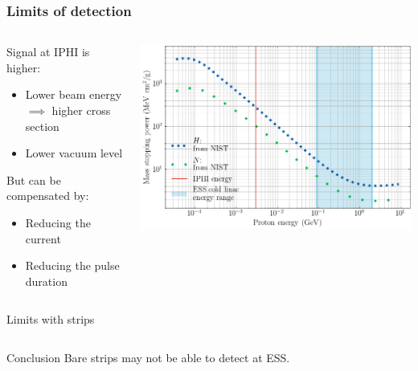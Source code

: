 \begin{frame}
  \frametitle{Limits of detection}
  \begin{columns}[T]
    \begin{column}{0.35\textwidth}
      \begin{block}{Signal at IPHI is higher:}
        \begin{itemize}
          \item Lower beam energy $\implies$ higher cross section
          \item Lower vacuum level
        \end{itemize}
        But can be compensated by:
        \begin{itemize}
          \item Reducing the current
          \item Reducing the pulse duration
        \end{itemize}
      \end{block}
    \end{column}
    \begin{column}{0.55\textwidth}
      \centering
      \includegraphics[width=1\textwidth]{04_Test/fig/fig000_bethe}
    \end{column}
  \end{columns}

  \begin{columns}[T]
    \begin{column}{0.45\textwidth}
      \begin{block}{Limits with strips}
      \end{block}
    \end{column}
    \begin{column}{0.45\textwidth}

    \end{column}
  \end{columns}
  \begin{alertblock}{Conclusion}
    Bare strips may not be able to detect at ESS.
  \end{alertblock}
\end{frame}

